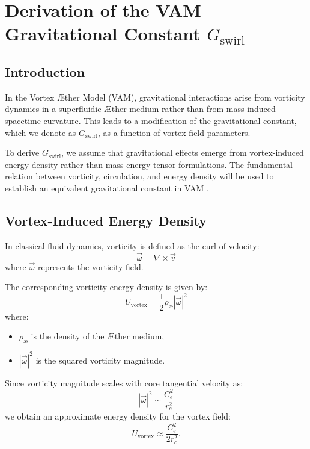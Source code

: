     \section*{Derivation of the VAM Gravitational Constant \(  G_\text{swirl} \)}

    \subsection*{Introduction}
    In the Vortex Æther Model (VAM), gravitational interactions arise from vorticity dynamics in a superfluidic Æther medium rather than from mass-induced spacetime curvature. This leads to a modification of the gravitational constant, which we denote as \(  G_\text{swirl} \), as a function of vortex field parameters.

    To derive \(  G_\text{swirl} \), we assume that gravitational effects emerge from vortex-induced energy density rather than mass-energy tensor formulations. The fundamental relation between vorticity, circulation, and energy density will be used to establish an equivalent gravitational constant in VAM \cite{onsager_superfluid, barcelo_superfluid, moffatt_helicity}.

    \subsection*{Vortex-Induced Energy Density}
    In classical fluid dynamics, vorticity is defined as the curl of velocity:
    \begin{equation*}
        \vec{\omega} = \nabla \times \vec{v}
    \end{equation*}
    where \( \vec{\omega} \) represents the vorticity field.

    The corresponding vorticity energy density is given by:
    \begin{equation*}
        U_\text{vortex} = \frac{1}{2} \rho_\text{\ae} |\vec{\omega}|^2
    \end{equation*}
    where:
    \begin{itemize}
        \item \( \rho_\text{\ae} \) is the density of the Æther medium,
        \item \( |\vec{\omega}|^2 \) is the squared vorticity magnitude.
    \end{itemize}

    Since vorticity magnitude scales with core tangential velocity as:
    \begin{equation*}
        |\vec{\omega}|^2 \sim \frac{C_e^2}{r_c^2}
    \end{equation*}
    we obtain an approximate energy density for the vortex field:
    \begin{equation*}
        U_\text{vortex} \approx \frac{C_e^2}{2 r_c^2}.
    \end{equation*}

